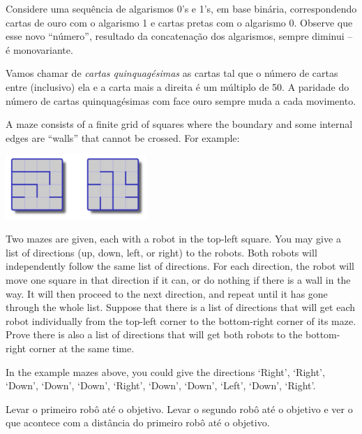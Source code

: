 \documentclass[10pt, a4paper]{article}
\begin{document}
	\newpage

	\begin{idea}
		Considere uma sequência de algarismos 0's e 1's, em base binária, correspondendo cartas de ouro com o algarismo 1 e cartas pretas com o algarismo 0. Observe que esse novo ``número'', resultado da concatenação dos algarismos, sempre diminui -- é monovariante.
	\end{idea}


	\begin{idea}
		Vamos chamar de \emph{cartas quinquagésimas} as cartas tal que o número de cartas entre (inclusivo) ela e a carta mais a direita é um múltiplo de 50. A paridade do número de cartas quinquagésimas com face ouro sempre muda a cada movimento.
	\end{idea}

	\newpage \setcounter{prob}{3}
	\begin{prob}
		A maze consists of a finite grid of squares where the boundary and some internal
edges are “walls” that cannot be crossed. For example:

	\begin{center}
		\includegraphics[width=0.4\textwidth]{pic.png}
	\end{center}

	Two mazes are given, each with a robot in the top-left square. You may give a list of directions
(up, down, left, or right) to the robots. Both robots will independently follow the same list of directions. For each direction, the robot will move one square in that direction if it can, or do
nothing if there is a wall in the way. It will then proceed to the next direction, and repeat until it
has gone through the whole list. Suppose that there is a list of directions that will get each robot
individually from the top-left corner to the bottom-right corner of its maze. Prove there is also a
list of directions that will get both robots to the bottom-right corner at the same time.

In the example mazes above, you could give the directions ‘Right’, ‘Right’, ‘Down’, ‘Down’,
‘Down’, ‘Right’, ‘Down’, ‘Down’, ‘Left’, ‘Down’, ‘Right’.
	\end{prob}

	\begin{idea}
		Levar o primeiro robô até o objetivo. Levar o segundo robô até o objetivo e ver o que acontece com a distância do primeiro robô até o objetivo.
	\end{idea}
\end{document}
